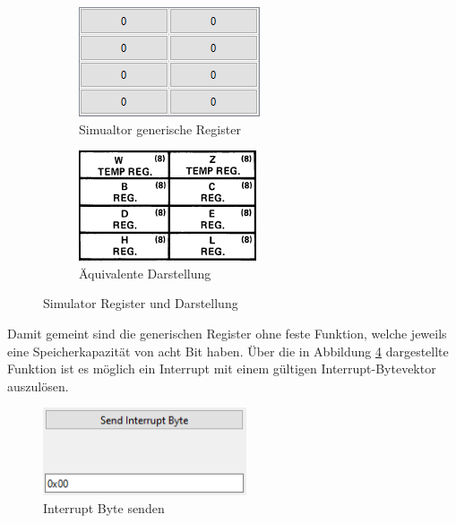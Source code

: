 \documentclass[12pt]{article}
\newcommand{\imgSpaceBefore}{\vspace{10pt}}
\begin{document}
\begin{figure}[h]
\centering
\begin{subfigure}{.5\textwidth}
  \centering
  \includegraphics[width=.7\linewidth]{bilder/GenericRegister_sim}
  \caption{Simualtor generische Register}
  \label{fig:GenReg_s}
\end{subfigure}%
\begin{subfigure}{.5\textwidth}
  \centering
  \includegraphics[width=.7\linewidth]{bilder/GenericRegister_pic}
  \caption{Äquivalente Darstellung}
  \label{fig:GenReg_p}
\end{subfigure}
\caption{Simulator Register und Darstellung}
\label{fig:GenReg}
\end{figure}

\noindent
Damit gemeint sind die generischen Register ohne feste Funktion, welche jeweils eine Speicherkapazität von acht Bit haben. Über die in Abbildung \ref{fig:Interrupt} dargestellte Funktion ist es möglich ein Interrupt mit einem gültigen Interrupt-Bytevektor auszulösen.\imgSpaceBefore

\begin{figure}[h]
\centering
\includegraphics[width=6cm]{bilder/Interrupt}
\caption{Interrupt Byte senden}
\label{fig:Interrupt}
\end{figure}
\end{document}
